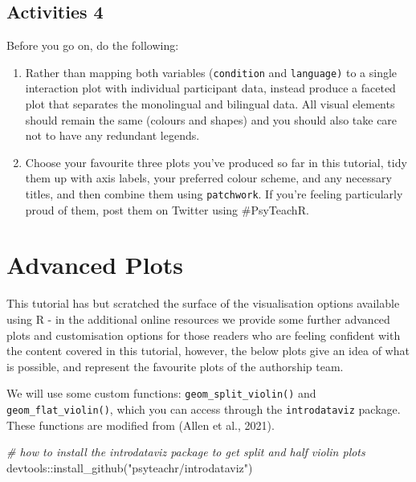 \documentclass[
  english,
  doc,floatsintext]{apa6}
\newenvironment{Shaded}{\begin{snugshade}}{\end{snugshade}}
\newcommand{\CommentTok}[1]{\textcolor[rgb]{0.56,0.35,0.01}{\textit{#1}}}
\newcommand{\FunctionTok}[1]{\textcolor[rgb]{0.00,0.00,0.00}{#1}}
\newcommand{\NormalTok}[1]{#1}
\newcommand{\SpecialCharTok}[1]{\textcolor[rgb]{0.00,0.00,0.00}{#1}}
\newcommand{\StringTok}[1]{\textcolor[rgb]{0.31,0.60,0.02}{#1}}
\begin{document}
\hypertarget{activities-4}{%
\subsection{Activities 4}\label{activities-4}}

Before you go on, do the following:

\begin{enumerate}
\def\labelenumi{\arabic{enumi}.}
\item
  Rather than mapping both variables (\texttt{condition} and \texttt{language)} to a single interaction plot with individual participant data, instead produce a faceted plot that separates the monolingual and bilingual data. All visual elements should remain the same (colours and shapes) and you should also take care not to have any redundant legends.
\item
  Choose your favourite three plots you've produced so far in this tutorial, tidy them up with axis labels, your preferred colour scheme, and any necessary titles, and then combine them using \texttt{patchwork}. If you're feeling particularly proud of them, post them on Twitter using \#PsyTeachR.
\end{enumerate}

\hypertarget{advanced-plots}{%
\section{Advanced Plots}\label{advanced-plots}}

This tutorial has but scratched the surface of the visualisation options available using R - in the additional online resources we provide some further advanced plots and customisation options for those readers who are feeling confident with the content covered in this tutorial, however, the below plots give an idea of what is possible, and represent the favourite plots of the authorship team.

We will use some custom functions: \texttt{geom\_split\_violin()} and \texttt{geom\_flat\_violin()}, which you can access through the \texttt{introdataviz} package. These functions are modified from (Allen et al., 2021).

\begin{Shaded}
\begin{Highlighting}[]
\CommentTok{\# how to install the introdataviz package to get split and half violin plots}
\NormalTok{devtools}\SpecialCharTok{::}\FunctionTok{install\_github}\NormalTok{(}\StringTok{"psyteachr/introdataviz"}\NormalTok{)}
\end{Highlighting}
\end{Shaded}
\end{document}
